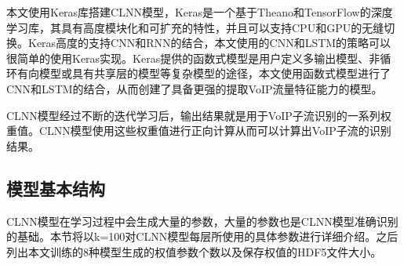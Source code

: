 本文使用Keras库搭建CLNN模型，Keras是一个基于Theano和TensorFlow的深度学习库，其具有高度模块化和可扩充的特性，并且可以支持CPU和GPU的无缝切换。Keras高度的支持CNN和RNN的结合，本文使用的CNN和LSTM的策略可以很简单的使用Keras实现。Keras提供的函数式模型是用户定义多输出模型、非循环有向模型或具有共享层的模型等复杂模型的途径，本文使用函数式模型进行了CNN和LSTM的结合，从而创建了具备更强的提取VoIP流量特征能力的模型。

CLNN模型经过不断的迭代学习后，输出结果就是用于VoIP子流识别的一系列权重值。CLNN模型使用这些权重值进行正向计算从而可以计算出VoIP子流的识别结果。

\subsection{模型基本结构}
CLNN模型在学习过程中会生成大量的参数，大量的参数也是CLNN模型准确识别的基础。本节将以k=100对CLNN模型每层所使用的具体参数进行详细介绍。之后列出本文训练的8种模型生成的权值参数个数以及保存权值的HDF5文件大小。

